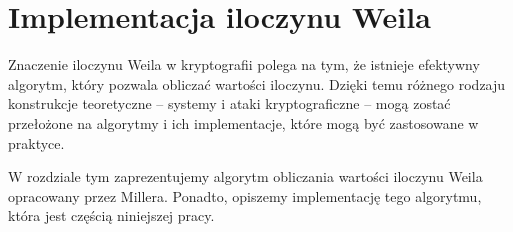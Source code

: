 \chapter{Implementacja iloczynu Weila}

Znaczenie iloczynu Weila w kryptografii polega na tym,
że istnieje efektywny algorytm,
który pozwala obliczać wartości iloczynu.
Dzięki temu różnego rodzaju konstrukcje teoretyczne --
systemy i ataki kryptograficzne --
mogą zostać przełożone na algorytmy i ich implementacje,
które mogą być zastosowane w praktyce.

W rozdziale tym zaprezentujemy algorytm obliczania wartości iloczynu Weila
opracowany przez Millera.
Ponadto, opiszemy implementację tego algorytmu,
która jest częścią niniejszej pracy.









